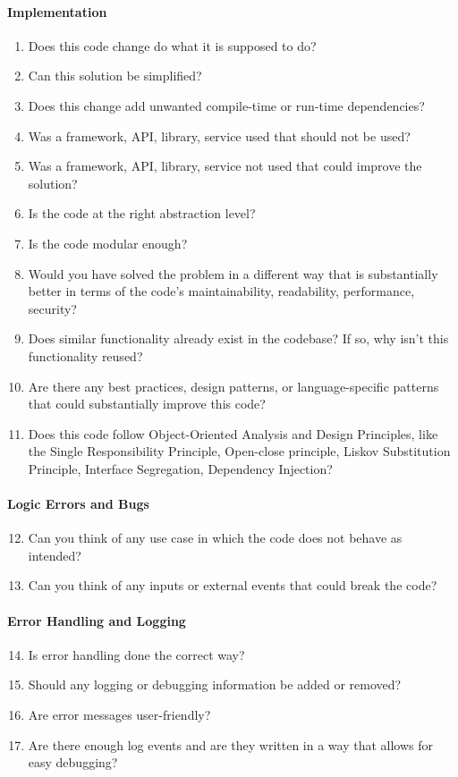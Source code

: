 \paragraph{Implementation}
\begin{enumerate}
    \item Does this code change do what it is supposed to do?
    \item Can this solution be simplified?
    \item Does this change add unwanted compile-time or run-time dependencies?
    \item Was a framework, API, library, service used that should not be used?
    \item Was a framework, API, library, service not used that could improve the solution?
    \item Is the code at the right abstraction level?
    \item Is the code modular enough?
    \item Would you have solved the problem in a different way that is substantially better in terms of the code’s maintainability, readability, performance, security?
    \item Does similar functionality already exist in the codebase? If so, why isn't this functionality reused?
    \item Are there any best practices, design patterns, or language-specific patterns that could substantially improve this code?
    \item Does this code follow Object-Oriented Analysis and Design Principles, like the Single Responsibility Principle, Open-close principle, Liskov Substitution Principle, Interface Segregation, Dependency Injection?
\end{enumerate}

\paragraph{Logic Errors and Bugs}
\begin{enumerate}
  \setcounter{enumi}{11}
  \item Can you think of any use case in which the code does not behave as intended?
  \item Can you think of any inputs or external events that could break the code?
\end{enumerate}
 
\paragraph{Error Handling and Logging} 
\begin{enumerate}
  \setcounter{enumi}{13}
  \item Is error handling done the correct way?
  \item Should any logging or debugging information be added or removed?
  \item Are error messages user-friendly?
  \item Are there enough log events and are they written in a way that allows for easy debugging?
\end{enumerate}

